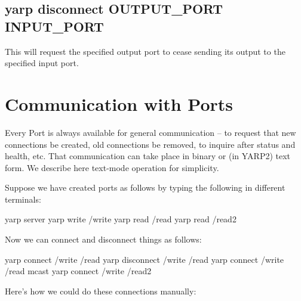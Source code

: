 \documentclass[a4]{article}
\begin{document}
\subsection{yarp disconnect OUTPUT\_PORT INPUT\_PORT}

This will request the specified output port to cease sending its output to
the specified input port.



\section{Communication with Ports}

Every Port is always available for general communication -- to request
that new connections be created, old connections be removed, to
inquire after status and health, etc.  That communication can take
place in binary or (in YARP2) text form.  We describe here text-mode
operation for simplicity.

Suppose we have created ports as follows by typing the following in
different terminals:
\begin{code}
  yarp server
  yarp write /write
  yarp read /read
  yarp read /read2
\end{code}
%
Now we can connect and disconnect things as follows:
\begin{code}
  yarp connect /write /read
  yarp disconnect /write /read
  yarp connect /write /read mcast
  yarp connect /write /read2
\end{code}

Here's how we could do these connections manually:
\end{document}
